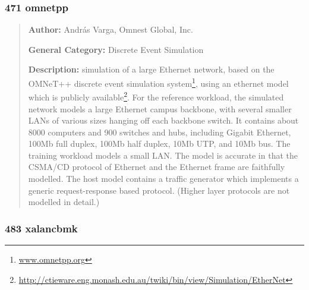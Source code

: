 \documentclass[onecolumn, openany, master, english, seal, signatures]{dbrgrptt}
\begin{document}
\subsubsection{471 omnetpp}

\begin{quote}
\textbf{Author:} András Varga, Omnest Global, Inc.

\textbf{General Category:} Discrete Event Simulation

\textbf{Description:} simulation of a large Ethernet network, based on the OMNeT++ discrete event simulation system\footnote{\url{www.omnetpp.org}}, using an ethernet model which is publicly available\footnote{\url{http://ctieware.eng.monash.edu.au/twiki/bin/view/Simulation/EtherNet}}.
For the reference workload, the simulated network models a large Ethernet campus backbone, with several smaller LANs of various sizes hanging off each backbone switch. It contains about 8000 computers and 900 switches and hubs, including Gigabit Ethernet, 100Mb full duplex, 100Mb half duplex, 10Mb UTP, and 10Mb bus. The training workload models a small LAN.
The model is accurate in that the CSMA/CD protocol of Ethernet and the Ethernet frame are faithfully modelled. The host model contains a traffic generator which implements a generic request-response based protocol. (Higher layer protocols are not modelled in detail.)
\end{quote}

\subsubsection{483 xalancbmk}
\end{document}
